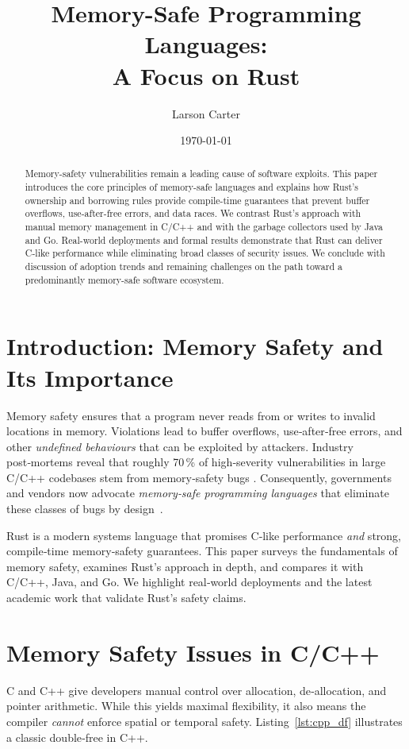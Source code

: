 \documentclass[11pt]{article}
\title{Memory-Safe Programming Languages:\\A Focus on Rust}
\author{Larson Carter}
\date{\today}
\begin{document}
\maketitle
\begin{abstract}
Memory-safety vulnerabilities remain a leading cause of software
exploits. This paper introduces the core principles of memory-safe
languages and explains how Rust's ownership and borrowing rules
provide compile-time guarantees that prevent buffer overflows,
use-after-free errors, and data races. We contrast Rust's approach with
manual memory management in C/C++ and with the garbage collectors used
by Java and Go. Real-world deployments and formal results demonstrate
that Rust can deliver C-like performance while eliminating broad
classes of security issues. We conclude with discussion of adoption
trends and remaining challenges on the path toward a predominantly
memory-safe software ecosystem.
\end{abstract}
\tableofcontents
\newpage

\section{Introduction: Memory Safety and Its Importance}
Memory safety ensures that a program never reads from or writes to invalid
locations in memory.
Violations lead to buffer overflows, use‑after‑free errors, and other
\emph{undefined behaviours} that can be exploited by attackers.
Industry post‑mortems reveal that roughly 70\,\% of high‑severity
vulnerabilities in large C/C++ codebases stem from memory‑safety bugs
\cite{msrc2019survey,google2022androidReport}.
Consequently, governments and vendors now advocate
\emph{memory‑safe programming languages} that eliminate these classes of bugs
by design~\cite{whitehouse2024memo}.

Rust is a modern systems language that promises C‑like performance \emph{and}
strong, compile‑time memory‑safety guarantees.
This paper surveys the fundamentals of memory safety, examines Rust’s approach
in depth, and compares it with C/C++, Java, and Go.
We highlight real‑world deployments and the latest academic work that validate
Rust’s safety claims.

\section{Memory Safety Issues in C/C++}
C and C++ give developers manual control over allocation, de‑allocation, and
pointer arithmetic.
While this yields maximal flexibility, it also means the compiler
\emph{cannot} enforce spatial or temporal safety.
Listing~\ref{lst:cpp_df} illustrates a classic double‑free in C++.
\end{document}
